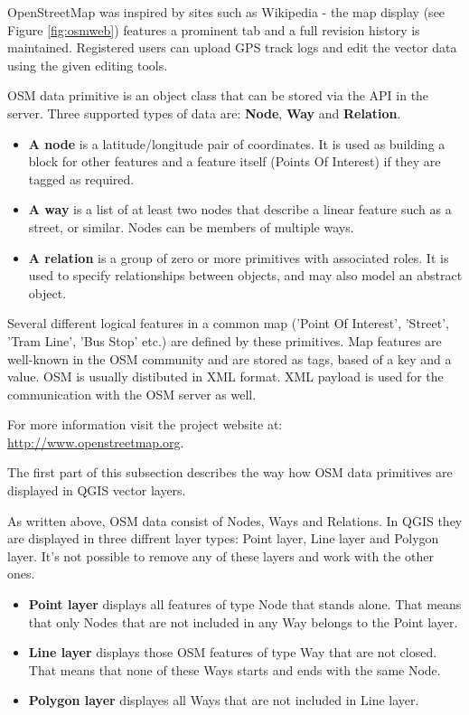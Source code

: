 OpenStreetMap was inspired by sites such as Wikipedia - the map display 
(see Figure \ref{fig:osmweb}) features a prominent  tab and a 
full revision history is maintained. Registered users can upload GPS track 
logs and edit the vector data using the given editing tools.

OSM data primitive is an object class that can be stored via the API in the
server. Three supported types of data are: \textbf{Node}, \textbf{Way} and 
\textbf{Relation}. 

\begin{itemize}
\item \textbf{A node} is a latitude/longitude pair of coordinates. It is 
used as building a block for other features and a feature itself (Points Of 
Interest) if they are tagged as required. 
\item \textbf{A way} is a list of at least two nodes that describe a linear
feature such as a street, or similar. Nodes can be members of multiple ways.
\item \textbf{A relation} is a group of zero or more primitives with 
associated roles. It is used to specify relationships between objects, 
and may also model an abstract object. 
\end{itemize}

Several different logical features in a common map ('Point Of Interest',
'Street', 'Tram Line', 'Bus Stop' etc.) are defined by these primitives. 
Map features are well-known in the OSM community and are stored as tags, 
based of a key and a value. OSM is usually distibuted in XML format. XML 
payload is used for the communication with the OSM server as well.

For more information visit the project website at:
\url{http://www.openstreetmap.org}.

\label{qgis-osm-connection}

The first part of this subsection describes the way how OSM data primitives 
are displayed in QGIS vector layers.

As written above, OSM data consist of Nodes, Ways and Relations. In QGIS they 
are displayed in three diffrent layer types: Point layer, Line layer and 
Polygon layer. It's not possible to remove any of these layers and work with 
the other ones.

\begin{itemize}
\item \textbf{Point layer} displays all features of type Node that stands 
alone. That means that only Nodes that are not included in any Way belongs 
to the Point layer.
\item \textbf{Line layer} displays those OSM features of type Way that are 
not closed. That means that none of these Ways starts and ends with the 
same Node.
\item \textbf{Polygon layer} displayes all Ways that are not included in 
Line layer.
\end{itemize}

